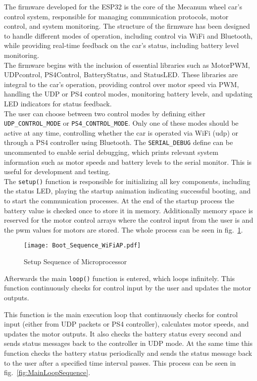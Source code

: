 \lstset{style=customcpp}
The firmware developed for the ESP32 is the core of the Mecanum wheel car's control system, responsible for managing communication protocols, motor control, and system monitoring. The structure of the firmware has been designed to handle different modes of operation, including control via WiFi and Bluetooth, while providing real-time feedback on the car’s status, including battery level monitoring.\\
The firmware begins with the inclusion of essential libraries such as MotorPWM, UDPcontrol, PS4Control, BatteryStatus, and StatusLED. These libraries are integral to the car's operation, providing control over motor speed via PWM, handling the UDP or PS4 control modes, monitoring battery levels, and updating LED indicators for status feedback.\\
The user can choose between two control modes by defining either \lstinline|UDP_CONTROL_MODE| or \lstinline|PS4_CONTROL_MODE|. Only one of these modes should be active at any time, controlling whether the car is operated via WiFi (\acs{udp}) or through a PS4 controller using Bluetooth.
The \lstinline|SERIAL_DEBUG| define can be uncommented to enable serial debugging, which prints relevant system information such as motor speeds and battery levels to the serial monitor. This is useful for development and testing.\\

The \lstinline|setup()| function is responsible for initializing all key components, including the status LED, playing the startup animation indicating successful booting, and to start the communication processes. At the end of the startup process the battery value is checked once to store it in memory. Additionally memory space is reserved for the motor control arrays where the control input from the user is and the \ac{pwm} values for motors are stored. The whole process can be seen in fig.~\ref{fig:SetuopSequence}.

\begin{figure}[h]
	\centering
	\captionsetup{justification=centering}
	\texttt{[image: Boot\_Sequence\_WiFiAP.pdf]}
	\caption{Setup Sequence of Microprocessor}
	\label{fig:SetuopSequence}
\end{figure}

Afterwards the main \lstinline|loop()| function is entered, which loops infinitely. This function continuously checks for control input by the user and updates the motor outputs. 

 This function is the main execution loop that continuously checks for control input (either from UDP packets or PS4 controller), calculates motor speeds, and updates the motor outputs. It also checks the battery status every second and sends status messages back to the controller in UDP mode. At the same time this function checks the battery status periodically and sends the status message back to the user after a specified time interval passes. This process can be seen in fig.~\ref{fig:MainLoopSequence}.

